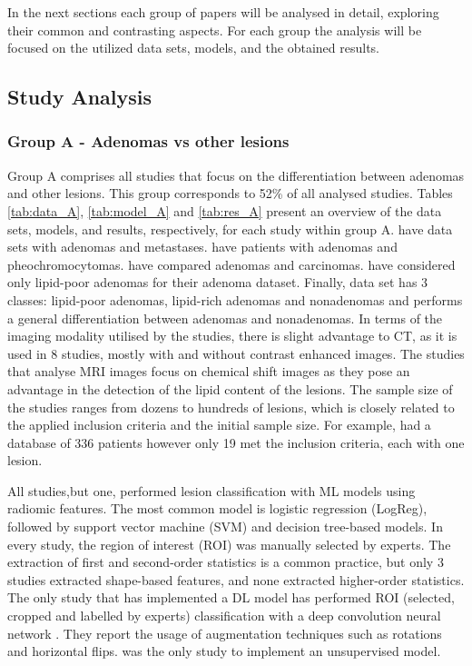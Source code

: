 \documentclass{article}
\begin{document}
In the next sections each group of papers will be analysed in detail, exploring their common and contrasting aspects. For each group the analysis will be focused on the utilized data sets, models, and the obtained results.

\subsection{Study Analysis}

\subsubsection{Group A - Adenomas vs other lesions}

Group A comprises all studies that focus on the differentiation between adenomas
and other lesions. This group corresponds to 52\% of all analysed studies.
Tables \ref{tab:data_A}, \ref{tab:model_A} and \ref{tab:res_A} present an
overview of the data sets, models, and results, respectively, for each study
within group A. \cite{Schieda2017,Tu2018,Tu2020} have data sets with adenomas
and metastases. \cite{Yi20181,Yi2018, Liu2022,Liu2021} have patients with
adenomas and pheochromocytomas. \cite{Elmohr2019, Torresan2021, Ho2019} have
compared adenomas and carcinomas. \cite{Tu2020, Yi2018, Yi20181, Liu2022} have
considered only lipid-poor adenomas for their adenoma dataset. Finally,
\cite{Romeo2018} data set has 3 classes: lipid-poor adenomas, lipid-rich
adenomas and nonadenomas and \cite{Kusunoki2022} performs a general
differentiation between adenomas and nonadenomas. In terms of the imaging
modality utilised by the studies, there is slight advantage to CT, as it is used
in 8 studies, mostly with and without contrast enhanced images. The studies that
analyse MRI images focus on chemical shift images as they pose an advantage in
the detection of the lipid content of the lesions. The sample size of the
studies ranges from dozens to hundreds of lesions, which is closely related to
the applied inclusion criteria and the initial sample size. For example,
\cite{Torresan2021} had a database of 336 patients however only 19 met the
inclusion criteria, each with one lesion.

All studies,but one, performed lesion classification with ML models using
radiomic features. The most common model is logistic regression (LogReg),
followed by support vector machine (SVM) and decision tree-based models. In
every study, the region of interest (ROI) was manually selected by experts. The
extraction of first and second-order statistics is a common practice, but only 3
studies extracted shape-based features, and none extracted higher-order
statistics. The only study that has implemented a DL model has performed ROI
(selected, cropped and labelled by experts) classification with a deep
convolution neural network \cite{Kusunoki2022}. They report the usage of
augmentation techniques such as rotations and horizontal flips.
\cite{Torresan2021} was the only study to implement an unsupervised model.
\end{document}
